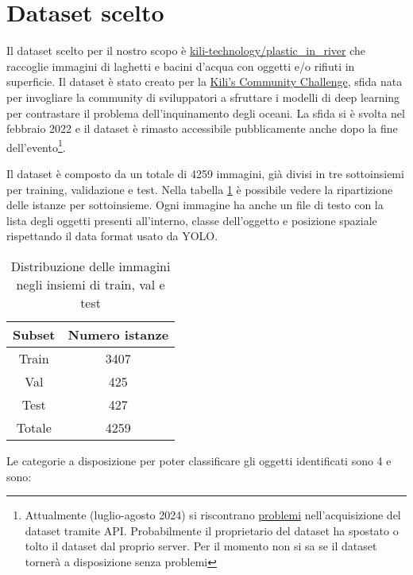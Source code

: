 \section{Dataset scelto}

Il dataset scelto per il nostro scopo è \href{https://huggingface.co/datasets/kili-technology/plastic_in_river}{kili-technology/plastic\_in\_river}
che raccoglie immagini di laghetti e bacini d'acqua con oggetti e/o rifiuti in superficie. 
Il dataset è stato creato per la \href{https://kili-technology.com/data-labeling/machine-learning/kili-s-community-challenge-plastic-in-river-dataset}{Kili's Community Challenge},
sfida nata per invogliare la community di sviluppatori a sfruttare i modelli di deep learning per contrastare il problema dell'inquinamento degli oceani. 
La sfida si è svolta nel febbraio 2022 e il dataset è rimasto accessibile pubblicamente anche dopo la fine 
dell'evento\footnote[1]{Attualmente (luglio-agosto 2024) si riscontrano \href{https://huggingface.co/datasets/kili-technology/plastic_in_river/discussions/2}{problemi} nell'acquisizione del dataset tramite API. Probabilmente il proprietario del dataset 
ha spostato o tolto il dataset dal proprio server. Per il momento non si sa se il dataset tornerà a disposizione senza problemi}. 

Il dataset è composto da un totale di 4259 immagini, già divisi in tre sottoinsiemi per training, validazione e test. Nella tabella \ref{table:1} 
è possibile vedere la ripartizione delle istanze per sottoinsieme. Ogni immagine ha anche un file di testo con 
la lista degli oggetti presenti all'interno, classe dell'oggetto e posizione spaziale rispettando il data format usato da YOLO.

\begin{table}[h!]
    \centering
    \begin{tabular}{ |c||c| } 
     \hline
     \textbf{Subset} & \textbf{Numero istanze} \\ 
     \hline
     Train & 3407 \\ 
     Val & 425 \\ 
     Test & 427 \\ 
     \hline
     Totale & 4259 \\
     \hline
    \end{tabular}
    \caption{Distribuzione delle immagini negli insiemi di train, val e test }
\label{table:1}
    \end{table}

Le categorie a disposizione per poter classificare gli oggetti identificati sono 4 e sono:


